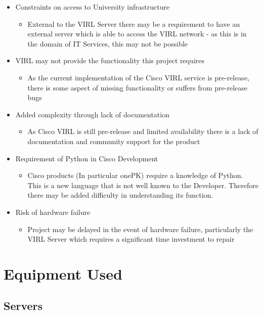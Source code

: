 \documentclass[11pt]{report}
\begin{document}
\begin{itemize}
  \item{Constraints on access to University infrastructure}
  \begin{itemize}
    \item{External to the VIRL Server there may be a requirement to have an external server which is able to access the VIRL network - as this is in the domain of IT Services, this may not be possible}
  \end{itemize}
  \item{VIRL may not provide the functionality this project requires}
  \begin{itemize}
    \item{As the current implementation of the Cisco VIRL service is pre-release, there is some aspect of missing functionality or suffers from pre-release bugs}
  \end{itemize}
  \item{Added complexity through lack of documentation}
  \begin{itemize}
    \item{As Cisco VIRL is still pre-release and limited availability there is a lack of documentation and community support for the product}
  \end{itemize}
  \item{Requirement of Python in Cisco Development}
  \begin{itemize}
    \item{Cisco products (In particular onePK) require a knowledge of Python. This is a new language that is not well known to the Developer. Therefore there may be added difficulty in understanding its function.}
  \end{itemize}
  \item{Risk of hardware failure}
  \begin{itemize}
    \item{Project may be delayed in the event of hardware failure, particularly the VIRL Server which requires a significant time investment to repair}
  \end{itemize}
\end{itemize}

\section{Equipment Used}


\subsection{Servers}
\end{document}
